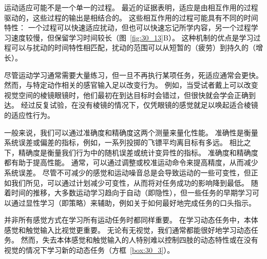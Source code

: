 运动适应可能不是一个单一的过程。
最近的证据表明，适应是由相互作用的过程驱动的，这些过程的输出是相结合的。
这些相互作用的过程可能具有不同的时间特性：
一个过程可以快速适应扰动，但也可以快速忘记所学内容，另一个过程学习速度较慢，但保留学习时间较长（图~\ref{fig:30_13}B）。
这种机制的优点是学习过程可以与扰动的时间特性相匹配，扰动的范围可以从短暂的（疲劳）到持久的（增长）。


尽管运动学习通常需要大量练习，但一旦不再执行某项任务，死适应通常会更快。
然而，与特定动作相关的感官输入足以改变行为。
例如，当受试者戴上可以改变视觉空间的棱镜眼镜时，他们最初在到达目标时会错过，但很快就会学会正确到达。
经过反复试验，在没有棱镜的情况下，仅凭眼镜的感觉就足以唤起适合棱镜的适应性行为。


一般来说，我们可以通过准确度和精确度这两个测量来量化性能。
准确性是衡量系统误差或偏差的指标，例如，一系列投掷的飞镖平均离目标有多远。
相比之下，精确度是衡量我们行为中的随机误差或统计变异性的指标。
准确度和精确度都有助于提高性能。
通常，可以通过调整或校准运动命令来提高精度，从而减少系统误差。
尽管不可减少的感觉和运动噪音总是会导致运动的一些可变性，但正如我们所见，可以通过计划减少可变性，从而将对任务成功的影响降到最低。
随着时间的推移，大多数运动学习趋向于自动（即隐性），但一些任务的早期学习可以通过显性学习（即策略）来辅助，例如关于如何最好地完成任务的口头指示。


并非所有感觉方式在学习所有运动任务时都同样重要。
在学习动态任务中，本体感觉和触觉输入比视觉更重要。 无论有无视觉，我们通常都能很好地学习动态任务。
然而，失去本体感觉和触觉输入的人特别难以控制四肢的动态特性或在没有视觉的情况下学习新的动态任务（方框~\ref{box:30_3}）。


